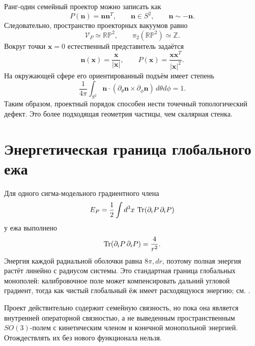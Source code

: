 Ранг-один семейный проектор можно записать как
\begin{equation}
 P(\mathbf n)=\mathbf n\mathbf n^T,
 \qquad \mathbf n\in S^2,
 \qquad \mathbf n\sim-\mathbf n.
 \label{eq:v5-projective-order-parameter}
\end{equation}
Следовательно, пространство проекторных вакуумов равно
\begin{equation}
 \mathcal V_P\simeq\mathbb{RP}^2,
 \qquad
 \pi_2(\mathbb{RP}^2)\simeq\mathbb Z.
 \label{eq:v5-rp2-pi2}
\end{equation}
Вокруг точки $\mathbf x=0$ естественный представитель задаётся
\begin{equation}
 \mathbf n(\mathbf x)=\frac{\mathbf x}{|\mathbf x|},
 \qquad
 P(\mathbf x)=\frac{\mathbf x\mathbf x^T}{|\mathbf x|^2}.
 \label{eq:v5-projective-hedgehog}
\end{equation}
На окружающей сфере его ориентированный подъём имеет степень
\begin{equation}
 \frac1{4\pi}\int_{S^2}
 \mathbf n\cdot
 (\partial_\theta\mathbf n\times\partial_\phi\mathbf n)
 \,d\theta d\phi=1.
 \label{eq:v5-hedgehog-degree}
\end{equation}
Таким образом, проектный порядок способен нести точечный топологический
дефект. Это более подходящая геометрия частицы, чем скалярная стенка.

\section{Энергетическая граница глобального ежа}

Для одного сигма-модельного градиентного члена
\begin{equation}
 E_P=\frac12\int d^3x\,\operatorname{Tr}(\partial_iP\,\partial_iP)
 \label{eq:v5-projector-gradient-energy}
\end{equation}
у ежа выполнено
\begin{equation}
 \operatorname{Tr}(\partial_iP\,\partial_iP)=\frac4{r^2}.
\end{equation}
Энергия каждой радиальной оболочки равна $8\pi,dr$, поэтому полная энергия
растёт линейно с радиусом системы. Это стандартная граница глобальных
монополей: калибровочное поле может компенсировать дальний угловой
градиент, тогда как чистый глобальный ёж имеет расходящуюся энергию; см.
.

Проект действительно содержит семейную связность, но пока она является
внутренней операторной связностью, а не выведенным пространственным
$SO(3)$-полем с кинетическим членом и конечной монопольной энергией.
Отождествлять их без нового функционала нельзя.

